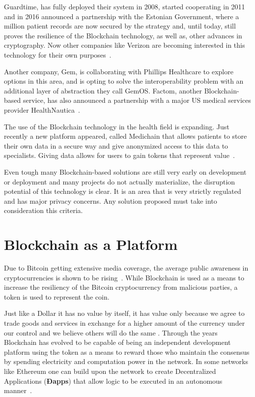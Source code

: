 Guardtime, has fully deployed their system in 2008, started cooperating in 2011
and in 2016 announced a partnership with the Estonian Government, where a
million patient records are now secured by the strategy and, until today, still
proves the resilience of the Blockchain technology, as well as, other advances
in cryptography.  Now other companies like Verizon are becoming interested in
this technology for their own
purposes~\cite{GuardTime2018,EstonianGovernmentGuardTime2016}.

Another company, Gem, is collaborating with Phillips Healthcare to explore
options in this area, and is opting to solve the interoperability problem with
an additional layer of abstraction they call GemOS.  Factom, another
Blockchain-based service, has also announced a partnership with a major US
medical services provider
HealthNautica~\cite{BlockchainCompHealth2017,FactomPartnership2017}.

The use of the Blockchain technology in the health field is expanding. Just
recently a new platform appeared, called Medichain that allows patients to
store their own data in a secure way and give anonymized access to this data to
specialists. Giving data allows for users to gain tokens that represent
value~\cite{MediChain2018}.

Even tough many Blockchain-based solutions are still very early on development
or deployment and many projects do not actually materialize, the disruption
potential of this technology is clear. It is an area that is very strictly
regulated and has major privacy concerns. Any solution proposed must take into
consideration this criteria.

\section{Blockchain as a Platform}

Due to Bitcoin getting extensive media coverage, the average public awareness
in cryptocurrencies is shown to be rising~\cite{BitAwareness2017}. While
Blockchain is used as a means to increase the resiliency of the Bitcoin
cryptocurrency from malicious parties, a token is used to represent the coin. 

Just like a Dollar it has no value by itself, it has value only because we
agree to trade goods and services in exchange for a higher amount of the
currency under our control and we believe others will do the same
\cite{aliessi2016}. Through the years Blockchain has evolved to be capable of
being an independent development platform using the token as a means to reward
those who maintain the consensus by spending electricity and computation power
in the network. In some networks like Ethereum one can build upon the network
to create Decentralized Applications (\textbf{Ðapps}) that allow logic to be
executed in an autonomous manner~\cite{Wood2017}. 

